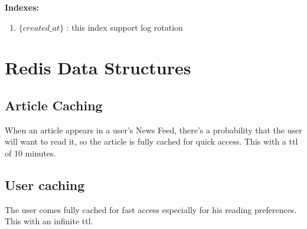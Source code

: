 \textbf{Indexes:}

\begin{enumerate}
  \item $\{ created\_at \}$ : this index support log rotation
\end{enumerate}

\section{Redis Data Structures}\label{sec:redis-data-structures}

\subsection{Article Caching}\label{subsec:article-caching}

When an article appears in a user's News Feed, there's a probability that the user will want to read it, so the article is fully cached for quick access.
This with a ttl of 10 minutes.

\subsection{User caching}\label{subsec:user-caching}

The user comes fully cached for fast access especially for his reading preferences.
This with an infinite ttl.





